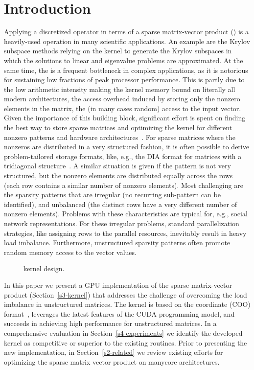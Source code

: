 \section{Introduction}
\label{s1-intro}
Applying a discretized operator
in terms of a sparse matrix-vector product (\spmv)
is a heavily-used operation in many scientific applications.
An example are the Krylov subspace methods relying on the \spmv kernel
to generate the Krylov subspaces in which the solutions
to linear and eigenvalue problems are approximated.
At the same time, the \spmv is a frequent bottleneck in complex applications,
as it is notorious for sustaining low fractions of peak processor performance.
This is partly due to the low arithmetic intensity making the 
\spmv kernel memory bound on literally all modern architectures,
the access overhead induced by storing only the nonzero elements in the matrix,
the (in many cases random) access to the input vector.
Given the importance of this building block,
significant effort is spent on finding the best way to store
sparse matrices and optimizing the \spmv kernel for
different nonzero patterns and hardware architectures~\cite{garlandspmv,sellpreport,Liu:2015:CES:2751205.2751209}.
For sparse matrices where the nonzeros are distributed in a very 
structured fashion, it is often possible to derive problem-tailored 
storage formats, like, e.g., the DIA format for matrices with a tridiagonal structure~\cite{garlandspmv}.
A similar situation is given if the pattern is not very structured, but the nonzero elements 
are distributed equally across the rows (each row contains 
a similar number of nonzero elements). 
Most challenging are the 
sparsity patterns that are irregular (no recurring sub-pattern can be identified),
and unbalanced (the distinct rows have a very different number of nonzero elements).
Problems with these characteristics are typical for, e.g., social network representations.
For these irregular problems, standard parallelization strategies, 
like assigning rows to the parallel resources,
inevitably result in heavy load imbalance.
Furthermore, unstructured sparsity patterns often promote 
random memory access to the vector values.

\begin{figure}
\begin{minipage}{\columnwidth}

\end{minipage}
\caption{\coo \spmv kernel design.}
\label{fig:spmv}
\end{figure}

In this paper we present
a GPU implementation 
of the sparse matrix-vector product (Section~\ref{s3-kernel})
that addresses the challenge of overcoming the load imbalance in unstructured
matrices. The kernel is based on the coordinate (COO) format~\cite{garlandspmv}, 
leverages the latest features of the CUDA programming model,
and succeeds in achieving high performance for unstructured matrices.
In a comprehensive evaluation in Section~\ref{s4-experiments} 
we identify the developed kernel as competitive or superior
to the existing routines.
Prior to presenting the new implementation, in Section~\ref{s2-related} we
review
existing efforts for optimizing the sparse matrix vector product
on manycore architectures.
